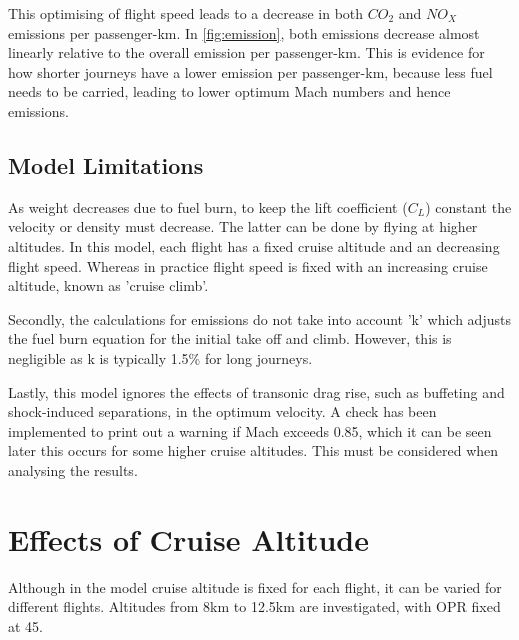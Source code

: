 \documentclass[12pt, a4paper]{article}
\begin{document}
This optimising of flight speed leads to a decrease in both $CO_2$ and $NO_X$ emissions per passenger-km. In \autoref{fig:emission}, both emissions decrease almost linearly relative to the overall emission per passenger-km. This is evidence for how shorter journeys have a lower emission per passenger-km, because less fuel needs to be carried, leading to lower optimum Mach numbers and hence emissions.

\subsection{Model Limitations}
As weight decreases due to fuel burn, to keep the lift coefficient ($C_L$) constant the velocity or density must decrease. The latter can be done by flying at higher altitudes. In this model, each flight has a fixed cruise altitude and an decreasing flight speed. Whereas in practice flight speed is fixed with an increasing cruise altitude, known as 'cruise climb'. 

Secondly, the calculations for emissions do not take into account 'k' which adjusts the fuel burn equation for the initial take off and climb. However, this is negligible as k is typically 1.5\% for long journeys.

Lastly, this model ignores the effects of transonic drag rise, such as buffeting and shock-induced separations, in the optimum velocity. A check has been implemented to print out a warning if Mach exceeds 0.85, which it can be seen later this occurs for some higher cruise altitudes. This must be considered when analysing the results.

\section{Effects of Cruise Altitude}
Although in the model cruise altitude is fixed for each flight, it can be varied for different flights. Altitudes from 8km to 12.5km are investigated, with OPR fixed at 45.
\end{document}
